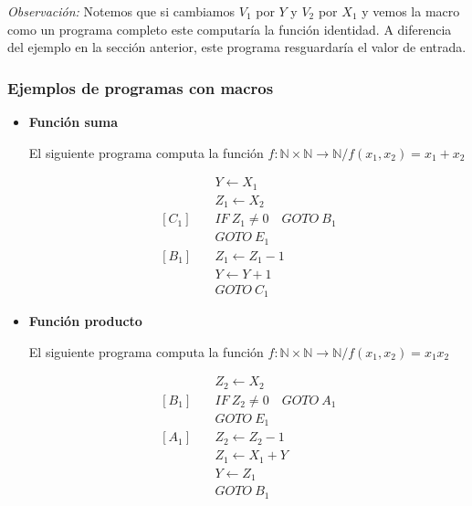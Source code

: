 \begin{itemize}
        \bigskip
        \textit{Observación:}
        Notemos que si cambiamos $V_1$ por $Y$ y $V_2$ por $X_1$ y vemos la
        macro como un programa completo este computaría la función identidad.
        A diferencia del ejemplo en la sección anterior, este programa 
        resguardaría el valor de entrada.
\end{itemize}

\subsubsection{Ejemplos de programas con macros}

\begin{itemize}
    \item \textbf{Función suma} \label{ej:funcion-suma}

        El siguiente programa computa la función 
        $f: \mathbb{N} \times \mathbb{N} \to \mathbb{N}/f(x_1, x_2) = x_1+x_2$

        \begin{align*}
                        &Y \gets X_1 \\
                        &Z_1 \gets X_2 \\
            [C_1] \quad &IF ~ Z_1 \neq 0 \quad GOTO ~ B_1 \\
                        &GOTO ~ E_1 \\
            [B_1] \quad &Z_1 \gets Z_1 - 1 \\
                        &Y \gets Y + 1 \\
                        &GOTO ~ C_1
        \end{align*}

    \item \textbf{Función producto} \label{ej:funcion-producto}

        El siguiente programa computa la función 
        $f: \mathbb{N} \times \mathbb{N} \to \mathbb{N}/f(x_1, x_2) = x_1 x_2$

        \begin{align*}
                        &Z_2 \gets X_2 \\
            [B_1] \quad &IF ~ Z_2 \neq 0 \quad GOTO ~ A_1 \\
                        &GOTO ~ E_1 \\
            [A_1] \quad &Z_2 \gets Z_2 - 1 \\
                        &Z_1 \gets X_1 + Y \\
                        &Y \gets Z_1 \\
                        &GOTO ~ B_1
        \end{align*}


\end{itemize}
